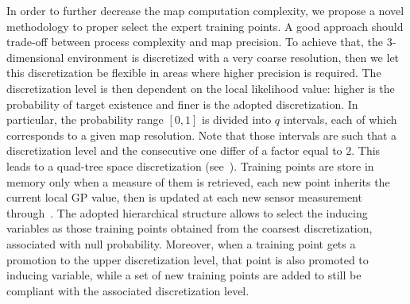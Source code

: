 In order to further decrease the map computation complexity, we propose a novel methodology to proper select the expert training points.
A good approach should trade-off between process complexity and map precision. To achieve that, the 3-dimensional environment is discretized
with a very coarse resolution, then we let this discretization be flexible in areas where higher precision is required.
The discretization level is then dependent on the local likelihood value: higher is the probability of target existence and finer is the adopted
discretization. In particular, the probability range $[0,1]$ is divided into $q$ intervals, each of which corresponds to a given map resolution.
Note that those intervals are such that a discretization level and the consecutive one differ of a factor equal to $2$.
This leads to a quad-tree space discretization (see~). Training points are store in memory only when a
measure of them is retrieved, each new point inherits the current local GP value, then is updated at each new sensor measurement
through~. The adopted hierarchical structure allows to select the inducing variables as those training
points obtained from the coarsest discretization, associated with null probability. Moreover, when a training point gets a promotion to the
upper discretization level, that point is also promoted to inducing variable, while a set of new training points are added to still be
compliant with the associated discretization level.


